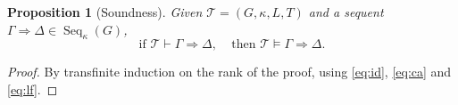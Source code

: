\documentclass{article}
\newtheorem{prop}{Proposition}
\theoremstyle{definition}
\DeclareMathOperator{\Seq}{Seq}
\begin{document}
\begin{prop}[Soundness]\label{prop:sound}
Given $\mathcal{T} = (G,\kappa,L,T)$ and a sequent $\Gamma \Rightarrow \Delta \in \Seq_\kappa(G)$,
$$\text{if } \mathcal{T} \vdash \Gamma \Rightarrow \Delta, ~~~~~\text{then } \mathcal{T} \vDash \Gamma \Rightarrow \Delta.$$
\end{prop}
\begin{proof}
By transfinite induction on the rank of the proof, using \cref{eq:id}, \cref{eq:ca} and \cref{eq:lf}.
\end{proof}

\end{document}
